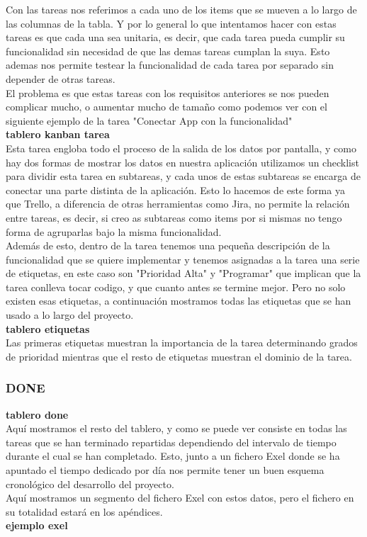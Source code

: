 \documentclass[12pt,a4paper]{article}
\begin{document}
	Con las tareas nos referimos a cada uno de los items que se mueven a lo largo de las columnas de la tabla. Y por lo general lo que intentamos hacer con estas tareas es que cada una sea unitaria, es decir, que cada tarea pueda cumplir su funcionalidad sin necesidad de que las demas tareas cumplan la suya. Esto ademas nos permite testear la funcionalidad de cada tarea por separado sin depender de otras tareas.\\
	El problema es que estas tareas con los requisitos anteriores se nos pueden complicar mucho, o aumentar mucho de tamaño como podemos ver con el siguiente ejemplo de la tarea "Conectar App con la funcionalidad"\\
\textbf{tablero kanban tarea}\\
	Esta tarea engloba todo el proceso de la salida de los datos por pantalla, y como hay dos formas de mostrar los datos en nuestra aplicación utilizamos un checklist para dividir esta tarea en subtareas, y cada unos de estas subtareas se encarga de conectar una parte distinta de la aplicación. Esto lo hacemos de este forma ya que Trello, a diferencia de otras herramientas como Jira, no permite la relación entre tareas, es decir, si creo as subtareas como items por si mismas no tengo forma de agruparlas bajo la misma funcionalidad.\\
	Además de esto, dentro de la tarea tenemos una pequeña descripción de la funcionalidad que se quiere implementar y tenemos asignadas a la tarea una serie de etiquetas, en este caso son "Prioridad Alta" y "Programar" que implican que la tarea conlleva tocar codigo, y que cuanto antes se termine mejor. Pero no solo existen esas etiquetas, a continuación mostramos todas las etiquetas que se han usado a lo largo del proyecto.\\
	\textbf{tablero etiquetas}\\
	Las primeras etiquetas muestran la importancia de la tarea determinando grados de prioridad mientras que el resto de etiquetas muestran el dominio de la tarea.	\subsubsection{DONE}
\textbf{tablero done}\\
Aquí mostramos el resto del tablero, y como se puede ver consiste en todas las tareas que se han terminado repartidas dependiendo del intervalo de tiempo durante el cual se han completado. Esto, junto a un fichero Exel donde se ha apuntado el tiempo dedicado por día nos permite tener un buen esquema cronológico del desarrollo del proyecto.\\
Aquí mostramos un segmento del fichero Exel con estos datos, pero el fichero en su totalidad estará en los apéndices.\\
\textbf{ejemplo exel}\\	
\end{document}
